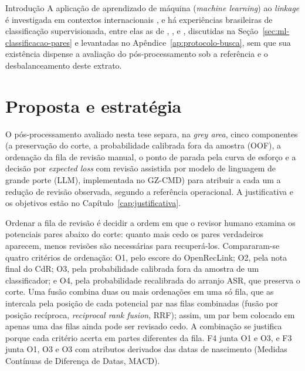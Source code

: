 \begin{chapter}{Introdução}
A aplicação de aprendizado de máquina (\textit{machine learning}) ao \textit{linkage} é investigada em contextos internacionais \cite{Binette2022entity, Vo2019ensemble, Jiao2021hybrid, Almadani2026linking}, e há experiências brasileiras de classificação supervisionada, entre elas as de , ,  e , discutidas na Seção~\ref{sec:ml-classificacao-pares} e levantadas no Apêndice~\ref{ap:protocolo-busca}, sem que sua existência dispense a avaliação do pós-processamento sob a referência e o desbalanceamento deste extrato.


\section{Proposta e estratégia}\label{sec:proposta-estrategia}

O pós-processamento avaliado nesta tese separa, na \textit{grey area}, cinco componentes (a preservação do corte, a probabilidade calibrada fora da amostra (OOF), a ordenação da fila de revisão manual, o ponto de parada pela curva de esforço e a decisão por \textit{expected loss} com revisão assistida por modelo de linguagem de grande porte (LLM), implementada no GZ-CMD) para atribuir a cada um a redução de revisão observada, segundo a referência operacional. A justificativa e os objetivos estão no Capítulo~\ref{cap:justificativa}.

Ordenar a fila de revisão é decidir a ordem em que o revisor humano examina os potenciais pares abaixo do corte: quanto mais cedo os pares verdadeiros aparecem, menos revisões são necessárias para recuperá-los. Compararam-se quatro critérios de ordenação: O1, pelo escore do OpenRecLink; O2, pela nota final do CdR; O3, pela probabilidade calibrada fora da amostra de um classificador; e O4, pela probabilidade recalibrada do arranjo ASR, que preserva o corte. Uma fusão combina duas ou mais ordenações em uma só fila, que as intercala pela posição de cada potencial par nas filas combinadas (fusão por posição recíproca, \textit{reciprocal rank fusion}, RRF); assim, um par bem colocado em apenas uma das filas ainda pode ser revisado cedo. A combinação se justifica porque cada critério acerta em partes diferentes da fila. F4 junta O1 e O3, e F3 junta O1, O3 e O3 com atributos derivados das datas de nascimento (Medidas Contínuas de Diferença de Datas, MACD).


\end{chapter}
